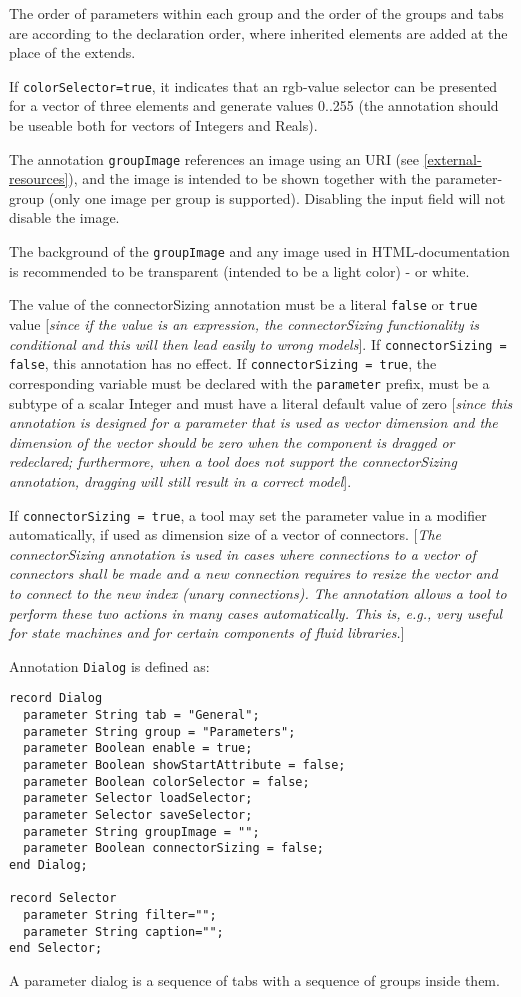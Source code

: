 The order of parameters within each group and the order of the groups and tabs are according
to the declaration order, where inherited elements are added at the place of the extends.

If \lstinline!colorSelector=true!, it indicates that an rgb-value selector can be
presented for a vector of three elements and generate values 0..255 (the
annotation should be useable both for vectors of Integers and Reals).

The annotation \lstinline!groupImage! references an image using an URI (see
\autoref{external-resources}), and the image is intended to be shown together with the
parameter-group (only one image per group is supported). Disabling the
input field will not disable the image.

The background of the \lstinline!groupImage! and any image used in HTML-documentation is recommended to be transparent (intended to be a light color) - or white.

The value of the connectorSizing annotation must be a literal
\lstinline!false! or \lstinline!true! value {[}\emph{since if the value is an
expression, the connectorSizing functionality is conditional and this
will then lead easily to wrong models}{]}. If \lstinline!connectorSizing = false!, this annotation has no effect.
If \lstinline!connectorSizing = true!, the corresponding variable must be declared with the
\lstinline!parameter! prefix, must be a subtype of a scalar Integer and
must have a literal default value of zero {[}\emph{since this annotation
is designed for a parameter that is used as vector dimension and the
dimension of the vector should be zero when the component is dragged or
redeclared; furthermore, when a tool does not support the
connectorSizing annotation, dragging will still result in a correct
model}{]}.

If \lstinline!connectorSizing = true!, a tool may set the parameter value
in a modifier automatically, if used as dimension size of a vector of
connectors. {[}\emph{The connectorSizing annotation is used in cases
where connections to a vector of connectors shall be made and a new
connection requires to resize the vector and to connect to the new index
(unary connections). The annotation allows a tool to perform these two
actions in many cases automatically. This is, e.g., very useful for
state machines and for certain components of fluid libraries.}{]}

Annotation \lstinline!Dialog! is defined as:

\begin{lstlisting}[language=modelica]
record Dialog
  parameter String tab = "General";
  parameter String group = "Parameters";
  parameter Boolean enable = true;
  parameter Boolean showStartAttribute = false;
  parameter Boolean colorSelector = false;
  parameter Selector loadSelector;
  parameter Selector saveSelector;
  parameter String groupImage = "";
  parameter Boolean connectorSizing = false;
end Dialog;

record Selector
  parameter String filter="";
  parameter String caption="";
end Selector;
\end{lstlisting}
A parameter dialog is a sequence of tabs with a sequence of groups
inside them.

